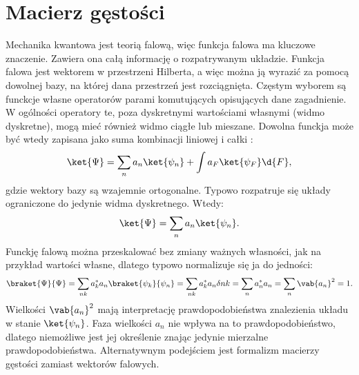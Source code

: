 \section{Macierz gęstości}
Mechanika kwantowa jest teorią falową, więc funkcja falowa ma kluczowe znaczenie. Zawiera ona całą informację o rozpatrywanym układzie. Funkcja falowa jest wektorem w przestrzeni Hilberta, a więc można ją wyrazić za pomocą dowolnej bazy, na której dana przestrzeń jest rozciągnięta. Częstym wyborem są funckcje własne operatorów parami komutujących opisujących dane zagadnienie. W ogólności operatory te, poza dyskretnymi wartościami własnymi (widmo dyskretne), mogą mieć również widmo ciągłe lub mieszane. Dowolna funckja może być wtedy zapisana jako suma kombinacji liniowej i całki \cite{davydov_mechanika_kwantowa}:
\begin{equation}\label{eq:funkcja_falowa_w_bazie_ogolna}
	\ket{\Psi} = \sum_{n} a_{n} \ket{\psi_{n}} + \int a_{F} \ket{\psi_{F}} \d{F},
\end{equation}
gdzie wektory bazy są wzajemnie ortogonalne. Typowo rozpatruje się układy ograniczone do jedynie widma dyskretnego. Wtedy:
\begin{equation}\label{eq:funkcja_falowa_w_bazie_dyskretna}
	\ket{\Psi} = \sum_{n} a_{n} \ket{\psi_{n}}.
\end{equation}
Funckję falową można przeskalować bez zmiany ważnych własności, jak na przykład wartości własne, dlatego typowo normalizuje się ja do jedności:
\begin{equation}\label{eq:funkcja_falowa_normalizacja}
	\braket{\Psi}{\Psi} = 
	\sum_{nk} a_{k}^{*}a_{n} \braket{\psi_{k}}{\psi_{n}} = 
	\sum_{nk} a_{k}^{*}a_{n} \delta{nk} = 
	\sum_{n} a_{n}^{*}a_{n} = 
	\sum_{n} \vab{a_{n}}^2 = 1.
\end{equation}
Wielkości \(\vab{a_{n}}^2\) mają interpretację prawdopodobieństwa znalezienia układu w stanie \(\ket{\psi_{n}}\). Faza wielkości \(a_{n}\) nie wpływa na to prawdopodobieństwo, dlatego niemożliwe jest jej określenie znając jedynie mierzalne prawdopodobieństwa. Alternatywnym podejściem jest formalizm macierzy gęstości zamiast wektorów falowych. 
